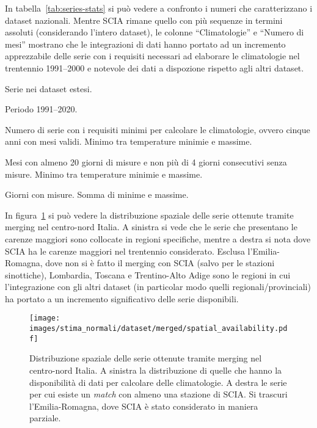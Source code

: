 In tabella~\ref{tab:series-stats} si può vedere a confronto i numeri che caratterizzano i dataset nazionali. Mentre SCIA rimane quello con più sequenze in termini assoluti (considerando l'intero dataset), le colonne ``Climatologie'' e ``Numero di mesi'' mostrano che le integrazioni di dati hanno portato ad un incremento apprezzabile delle serie con i requisiti necessari ad elaborare le climatologie nel trentennio 1991--2000 e notevole dei dati a dispozione rispetto agli altri dataset.
\begin{table}[ht]
  \centering
  \begin{threeparttable}
    \caption{\small Serie nei dataset estesi.}\label{tab:series-stats}
    \scriptsize
    
    \begin{tablenotes}
    \item [*] Periodo 1991--2020.
    \item [1] Numero di serie con i requisiti minimi per calcolare le climatologie, ovvero cinque anni con mesi validi. Minimo tra temperature minimie e massime.
    \item [2] Mesi con almeno 20 giorni di misure e non più di 4 giorni consecutivi senza misure. Minimo tra temperature minimie e massime.
    \item [3] Giorni con misure. Somma di minime e massime.
    \end{tablenotes}
  \end{threeparttable}
\end{table}

In figura~\ref{fig:merged-series} si può vedere la distribuzione spaziale delle serie ottenute tramite merging nel centro-nord Italia. A sinistra si vede che le serie che presentano le carenze maggiori sono collocate in regioni specifiche, mentre a destra si nota dove SCIA ha le carenze maggiori nel trentennio considerato. Esclusa l'Emilia-Romagna, dove non si è fatto il merging con SCIA (salvo per le stazioni sinottiche), Lombardia, Toscana e Trentino-Alto Adige sono le regioni in cui l'integrazione con gli altri dataset (in particolar modo quelli regionali/provinciali) ha portato a un incremento significativo delle serie disponibili.
\begin{figure}[ht]
  \centering
  \texttt{[image: images/stima\_normali/dataset/merged/spatial\_availability.pdf]}
  \caption{\small Distribuzione spaziale delle serie ottenute tramite merging nel centro-nord Italia. A sinistra la distribuzione di quelle che hanno la disponibilità di dati per calcolare delle climatologie. A destra le serie per cui esiste un \emph{match} con almeno una stazione di SCIA. Si trascuri l'Emilia-Romagna, dove SCIA è stato considerato in maniera parziale.}\label{fig:merged-series}
\end{figure}

